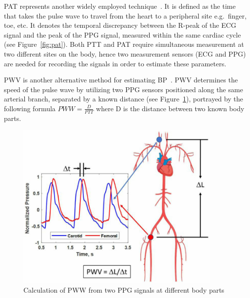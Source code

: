 \ac{PAT} represents another widely employed technique~\cite{sharmaCuffLessContinuousBlood2017}.
It is defined as the time that takes the pulse wave to travel from the heart to a peripheral site e.g.\ finger, toe, etc.
It denotes the temporal discrepancy between the R-peak of the ECG signal and the peak of the PPG signal, measured within the same cardiac cycle (see Figure~\ref{fig:pat}).
Both PTT and PAT require simultaneous measurement at two different sites on the body, hence two measurement sensors (ECG and PPG) are needed for recording the signals in order to estimate these parameters.

\ac{PWV} is another alternative method for estimating BP~\cite{mccombieAdaptiveBloodPressure2006}.
PWV determines the speed of the pulse wave by utilizing two PPG sensors positioned along the same arterial branch, separated by a known distance (see Figure~\ref{fig:pww}), portrayed by the following formula
\begin{math}
    PWW = \frac{D}{PTT}
\end{math}
where D is the distance between two known body parts.

\begin{figure}
    \begin{minipage}[c]{0.5\textwidth}
        \includegraphics[width=0.90\textwidth]{images/sp/pww}
    \end{minipage}\hfill
    \begin{minipage}[c]{0.5\textwidth}
        \captionsetup{format=plain, justification=centering, font=small}
        \caption{Calculation of PWW from two PPG signals at different body parts~\cite{urbanUnderstandingArterialBiomechanics2023}}
        \label{fig:pww}
    \end{minipage}
\end{figure}

